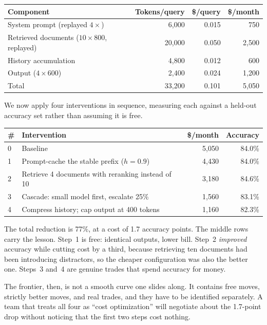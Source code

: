 \documentclass[11pt]{book}
\begin{document}
\begin{center}
\begin{tabular}{lrrr}
\toprule
Component & Tokens/query & \$/query & \$/month \\
\midrule
System prompt (replayed $4\times$) & 6{,}000 & 0.015 & 750 \\
Retrieved documents ($10\times800$, replayed) & 20{,}000 & 0.050 & 2{,}500 \\
History accumulation & 4{,}800 & 0.012 & 600 \\
Output ($4 \times 600$) & 2{,}400 & 0.024 & 1{,}200 \\
\midrule
Total & 33{,}200 & 0.101 & 5{,}050 \\
\bottomrule
\end{tabular}
\end{center}

We now apply four interventions in sequence, measuring each against a held-out accuracy set rather than assuming it is free.

\begin{center}
\begin{tabular}{llrr}
\toprule
\# & Intervention & \$/month & Accuracy \\
\midrule
0 & Baseline & 5{,}050 & 84.0\% \\
1 & Prompt-cache the stable prefix ($h=0.9$) & 4{,}430 & 84.0\% \\
2 & Retrieve 4 documents with reranking instead of 10 & 3{,}180 & 84.6\% \\
3 & Cascade: small model first, escalate 25\% & 1{,}560 & 83.1\% \\
4 & Compress history; cap output at 400 tokens & 1{,}160 & 82.3\% \\
\bottomrule
\end{tabular}
\end{center}

The total reduction is 77\%, at a cost of 1.7 accuracy points. The middle rows carry the lesson. Step~1 is free: identical outputs, lower bill. Step~2 \textit{improved} accuracy while cutting cost by a third, because retrieving ten documents had been introducing distractors, so the cheaper configuration was also the better one. Steps~3 and~4 are genuine trades that spend accuracy for money.

The frontier, then, is not a smooth curve one slides along. It contains free moves, strictly better moves, and real trades, and they have to be identified separately. A team that treats all four as ``cost optimization'' will negotiate about the 1.7-point drop without noticing that the first two steps cost nothing.
\end{document}
